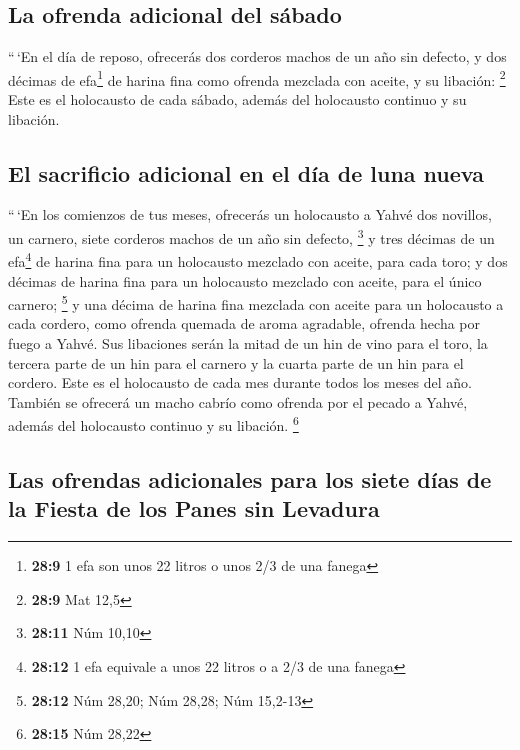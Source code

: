 \hypertarget{la-ofrenda-adicional-del-suxe1bado}{%
\subsection{La ofrenda adicional del
sábado}\label{la-ofrenda-adicional-del-suxe1bado}}

 ``\,`En el día de reposo, ofrecerás dos corderos machos
de un año sin defecto, y dos décimas de efa\footnote{\textbf{28:9} 1 efa
  son unos 22 litros o unos 2/3 de una fanega} de harina fina como
ofrenda mezclada con aceite, y su libación: \footnote{\textbf{28:9} Mat
  12,5}  Este es el holocausto de cada sábado, además del
holocausto continuo y su libación.

\hypertarget{el-sacrificio-adicional-en-el-duxeda-de-luna-nueva}{%
\subsection{El sacrificio adicional en el día de luna
nueva}\label{el-sacrificio-adicional-en-el-duxeda-de-luna-nueva}}

 ``\,`En los comienzos de tus meses, ofrecerás un
holocausto a Yahvé dos novillos, un carnero, siete corderos machos de un
año sin defecto, \footnote{\textbf{28:11} Núm 10,10}  y
tres décimas de un efa\footnote{\textbf{28:12} 1 efa equivale a unos 22
  litros o a 2/3 de una fanega} de harina fina para un holocausto
mezclado con aceite, para cada toro; y dos décimas de harina fina para
un holocausto mezclado con aceite, para el único carnero; \footnote{\textbf{28:12}
  Núm 28,20; Núm 28,28; Núm 15,2-13}  y una décima de
harina fina mezclada con aceite para un holocausto a cada cordero, como
ofrenda quemada de aroma agradable, ofrenda hecha por fuego a Yahvé.
 Sus libaciones serán la mitad de un hin de vino para el
toro, la tercera parte de un hin para el carnero y la cuarta parte de un
hin para el cordero. Este es el holocausto de cada mes durante todos los
meses del año.  También se ofrecerá un macho cabrío como
ofrenda por el pecado a Yahvé, además del holocausto continuo y su
libación. \footnote{\textbf{28:15} Núm 28,22}

\hypertarget{las-ofrendas-adicionales-para-los-siete-duxedas-de-la-fiesta-de-los-panes-sin-levadura}{%
\subsection{Las ofrendas adicionales para los siete días de la Fiesta de
los Panes sin
Levadura}\label{las-ofrendas-adicionales-para-los-siete-duxedas-de-la-fiesta-de-los-panes-sin-levadura}}

